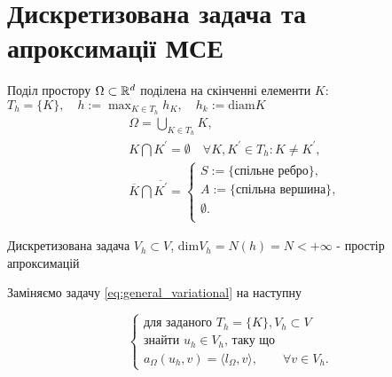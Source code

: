 
\section{Дискретизована задача та апроксимації МСЕ}
\frame{\sectionpage}
\begin{frame}{Поділ простору}
		 $\Omega \subset \mathbb{R}^d$ поділена на скінченні елементи $K$:
		 $
			T_h=\lbrace K \rbrace, \quad
			h := \max_{K \in T_h}h_K, \quad
			h_k := \mbox{diam} K
		$
		\begin{equation}\label{eq:split_properties}
			\begin{split}
				& \Omega = \bigcup_{K \in T_h} K, \\
				& K \bigcap K^\prime = \emptyset \quad \forall K, K^\prime \in T_h : K \neq K^\prime, \\
				& \overline K \bigcap \overline {K^\prime} =
				\begin{cases}
					S := \mbox{\{спільне ребро\}}, \\
					A := \mbox{\{спільна вершина\}},  \\
					\emptyset. \\
				\end{cases}
			\end{split}
		\end{equation}
\end{frame}

\begin{frame}{Дискретизована задача}
		$V_h \subset V$, $\mbox{dim} V_h = N(h) = N < + \infty$ - простір апроксимацій

		Заміняємо задачу \eqref{eq:general_variational} на наступну

		\begin{equation}\label{eq:general_discrete}
			\begin{cases}
				\mbox{для заданого } T_h = \{K\}, V_h  \subset V \\
				\mbox{знайти } u_h \in V_h \mbox{, таку що} \\
				a_\Omega(u_h, v) = \langle l_\Omega, v \rangle, \qquad \forall v \in V_h.
			\end{cases}
		\end{equation}

\end{frame}

